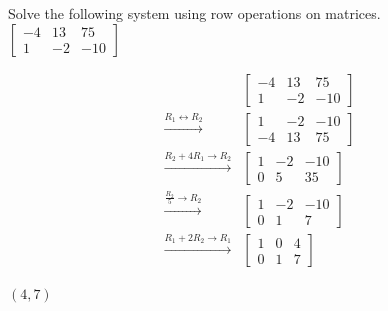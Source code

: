\documentclass[addpoints]{exam}
\begin{document}
\begin{questions}
\question[5] Solve the following system using row operations on matrices.\\

\(\displaystyle{ \left[\begin{array}{cc|c} -4 & 13 & 75 \\ 1 & -2 & -10 \end{array}\right] }\)

 
 \answerline
\begin{solution}
\[\begin{aligned} & \left[\begin{array}{cc|c} -4 & 13 & 75 \\ 1 & -2 & -10 \end{array}\right] \\ \xrightarrow{R_1 \leftrightarrow R_2} & \left[\begin{array}{cc|c} 1 & -2 & -10 \\ -4 & 13 & 75 \end{array}\right] \\ \xrightarrow{R_2 + 4R_1 \to R_2} & \left[\begin{array}{cc|c} 1 & -2 & -10 \\ 0 & 5 & 35 \end{array}\right] \\ \xrightarrow{\frac{R_2}{5} \to R_2} & \left[\begin{array}{cc|c} 1 & -2 & -10 \\ 0 & 1 & 7 \end{array}\right] \\ \xrightarrow{R_1 + 2R_2 \to R_1} & \left[\begin{array}{cc|c} 1 & 0 & 4 \\ 0 & 1 & 7 \end{array}\right] \end{aligned}\]

\(\boxed{ (4, 7) }\)
\end{solution}
\newpage


\end{questions}
\end{document}
